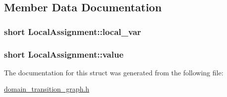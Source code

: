 \subsection{Member Data Documentation}
\hypertarget{structLocalAssignment_acc7b3a52ff922c78dc4583e4640a37fe}{
\subsubsection[{local\-\_\-var}]{\setlength{\rightskip}{0pt plus 5cm}short Local\-Assignment\-::local\-\_\-var}}\label{structLocalAssignment_acc7b3a52ff922c78dc4583e4640a37fe}
\hypertarget{structLocalAssignment_a3b1c088b78871e6100ba01ace4e1e40a}{
\subsubsection[{value}]{\setlength{\rightskip}{0pt plus 5cm}short Local\-Assignment\-::value}}\label{structLocalAssignment_a3b1c088b78871e6100ba01ace4e1e40a}


The documentation for this struct was generated from the following file\-:\begin{DoxyCompactItemize}
\item 
\hyperlink{domain__transition__graph_8h}{domain\-\_\-transition\-\_\-graph.\-h}\end{DoxyCompactItemize}
